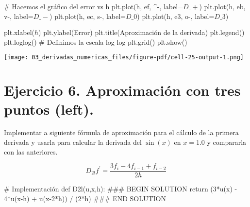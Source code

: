 \documentclass[
  letterpaper,
  DIV=11,
  numbers=noendperiod]{scrreprt}
\newenvironment{Shaded}{\begin{snugshade}}{\end{snugshade}}
\newcommand{\CommentTok}[1]{\textcolor[rgb]{0.37,0.37,0.37}{#1}}
\newcommand{\ControlFlowTok}[1]{\textcolor[rgb]{0.00,0.23,0.31}{#1}}
\newcommand{\DecValTok}[1]{\textcolor[rgb]{0.68,0.00,0.00}{#1}}
\newcommand{\KeywordTok}[1]{\textcolor[rgb]{0.00,0.23,0.31}{#1}}
\newcommand{\NormalTok}[1]{\textcolor[rgb]{0.00,0.23,0.31}{#1}}
\newcommand{\OperatorTok}[1]{\textcolor[rgb]{0.37,0.37,0.37}{#1}}
\newcommand{\RegionMarkerTok}[1]{\textcolor[rgb]{0.00,0.23,0.31}{#1}}
\newcommand{\StringTok}[1]{\textcolor[rgb]{0.13,0.47,0.30}{#1}}
\begin{document}
\begin{Shaded}
\begin{Highlighting}[]
\CommentTok{\# Hacemos el gráfico del error vs h}
\NormalTok{plt.plot(h, ef, }\StringTok{\textquotesingle{}\^{}{-}\textquotesingle{}}\NormalTok{, label}\OperatorTok{=}\StringTok{\textquotesingle{}$D\_+$\textquotesingle{}}\NormalTok{)}
\NormalTok{plt.plot(h, eb, }\StringTok{\textquotesingle{}v{-}\textquotesingle{}}\NormalTok{, label}\OperatorTok{=}\StringTok{\textquotesingle{}$D\_{-}$\textquotesingle{}}\NormalTok{)}
\NormalTok{plt.plot(h, ec, }\StringTok{\textquotesingle{}s{-}\textquotesingle{}}\NormalTok{, label}\OperatorTok{=}\StringTok{\textquotesingle{}$D\_0$\textquotesingle{}}\NormalTok{)}
\NormalTok{plt.plot(h, e3, }\StringTok{\textquotesingle{}o{-}\textquotesingle{}}\NormalTok{, label}\OperatorTok{=}\StringTok{\textquotesingle{}$D\_3$\textquotesingle{}}\NormalTok{)}

\NormalTok{plt.xlabel(}\StringTok{\textquotesingle{}$h$\textquotesingle{}}\NormalTok{)}
\NormalTok{plt.ylabel(}\StringTok{\textquotesingle{}Error\textquotesingle{}}\NormalTok{)}
\NormalTok{plt.title(}\StringTok{\textquotesingle{}Aproximación de la derivada\textquotesingle{}}\NormalTok{)}
\NormalTok{plt.legend()}
\NormalTok{plt.loglog()  }\CommentTok{\# Definimos la escala log{-}log}
\NormalTok{plt.grid()}
\NormalTok{plt.show()}
\end{Highlighting}
\end{Shaded}

\texttt{[image: 03\_derivadas\_numericas\_files/figure-pdf/cell-25-output-1.png]}

\section{Ejercicio 6. Aproximación con tres puntos
(left).}\label{ejercicio-6.-aproximaciuxf3n-con-tres-puntos-left.}

Implementar a siguiente fórmula de aproximación para el cálculo de la
primera derivada y usarla para calcular la derivada del \(\sin(x)\) en
\(x=1.0\) y compararla con las anteriores.

\[
D_{2l}f^\prime = \frac{3 f_i - 4 f_{i-1} + f_{i-2}}{2h}
\]

\begin{Shaded}
\begin{Highlighting}[]
\CommentTok{\# Implementación}
\KeywordTok{def}\NormalTok{ D2l(u,x,h):}
    \CommentTok{\#\#\# }\RegionMarkerTok{BEGIN}\CommentTok{ SOLUTION}
    \ControlFlowTok{return}\NormalTok{ (}\DecValTok{3}\OperatorTok{*}\NormalTok{u(x) }\OperatorTok{{-}} \DecValTok{4}\OperatorTok{*}\NormalTok{u(x}\OperatorTok{{-}}\NormalTok{h) }\OperatorTok{+}\NormalTok{ u(x}\OperatorTok{{-}}\DecValTok{2}\OperatorTok{*}\NormalTok{h)) }\OperatorTok{/}\NormalTok{ (}\DecValTok{2}\OperatorTok{*}\NormalTok{h)}
    \CommentTok{\#\#\# }\RegionMarkerTok{END}\CommentTok{ SOLUTION}
\end{Highlighting}
\end{Shaded}
\end{document}
